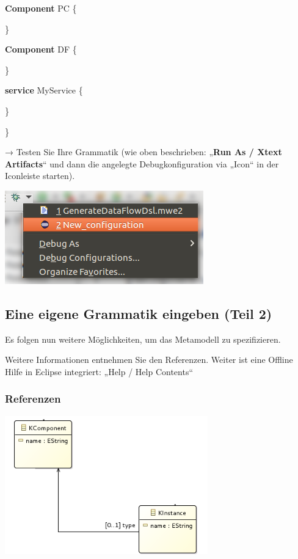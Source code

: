 \documentclass[a4]{article}
\begin{document}
\textbf{Component}
PC \{

\}

\textbf{Component} DF \{

\}

\textbf{service} MyService \{

\}

\}

→ Testen Sie Ihre Grammatik (wie oben beschrieben: „\textbf{Run As /
Xtext Artifacts}`` und dann die angelegte Debugkonfiguration via „Icon``
in der Iconleiste starten).

\includegraphics[width=3.38540in,height=1.59370in]{./Pictures/100002010000014500000099ABA38A95A85F29E5.png}

\subsection[Eine eigene Grammatik eingeben (Teil
2)]{\texorpdfstring{\protect\hypertarget{anchor-23}{}{}Eine eigene
Grammatik eingeben (Teil
2)}{Eine eigene Grammatik eingeben (Teil 2)}}\label{eine-eigene-grammatik-eingeben-teil-2}

Es folgen nun weitere Möglichkeiten, um das Metamodell zu spezifizieren.

Weitere Informationen entnehmen Sie den Referenzen. Weiter ist eine
Offline Hilfe in Eclipse integriert: „Help / Help Contents``

\subsubsection[Referenzen]{\texorpdfstring{\protect\hypertarget{anchor-24}{}{}Referenzen}{Referenzen}}\label{referenzen}

\includegraphics[width=3.45830in,height=2.35830in]{./Pictures/100002010000019F0000011B523F6AF86839FE43.png}
\end{document}
